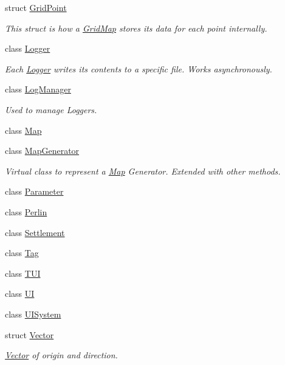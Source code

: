 \begin{DoxyCompactItemize}
struct \mbox{\hyperlink{struct_world_architect_1_1_grid_point}{Grid\+Point}}
\begin{DoxyCompactList}\small\item\em This struct is how a \mbox{\hyperlink{class_world_architect_1_1_grid_map}{Grid\+Map}} stores its data for each point internally. \end{DoxyCompactList}\item 
class \mbox{\hyperlink{class_world_architect_1_1_logger}{Logger}}
\begin{DoxyCompactList}\small\item\em Each \mbox{\hyperlink{class_world_architect_1_1_logger}{Logger}} writes it\textquotesingle{}s contents to a specific file. Works asynchronously. \end{DoxyCompactList}\item 
class \mbox{\hyperlink{class_world_architect_1_1_log_manager}{Log\+Manager}}
\begin{DoxyCompactList}\small\item\em Used to manage Loggers. \end{DoxyCompactList}\item 
class \mbox{\hyperlink{class_world_architect_1_1_map}{Map}}
\item 
class \mbox{\hyperlink{class_world_architect_1_1_map_generator}{Map\+Generator}}
\begin{DoxyCompactList}\small\item\em Virtual class to represent a \mbox{\hyperlink{class_world_architect_1_1_map}{Map}} Generator. Extended with other methods. \end{DoxyCompactList}\item 
class \mbox{\hyperlink{class_world_architect_1_1_parameter}{Parameter}}
\item 
class \mbox{\hyperlink{class_world_architect_1_1_perlin}{Perlin}}
\item 
class \mbox{\hyperlink{class_world_architect_1_1_settlement}{Settlement}}
\item 
class \mbox{\hyperlink{class_world_architect_1_1_tag}{Tag}}
\item 
class \mbox{\hyperlink{class_world_architect_1_1_t_u_i}{T\+UI}}
\item 
class \mbox{\hyperlink{class_world_architect_1_1_u_i}{UI}}
\item 
class \mbox{\hyperlink{class_world_architect_1_1_u_i_system}{U\+I\+System}}
\item 
struct \mbox{\hyperlink{struct_world_architect_1_1_vector}{Vector}}
\begin{DoxyCompactList}\small\item\em \mbox{\hyperlink{struct_world_architect_1_1_vector}{Vector}} of origin and direction. \end{DoxyCompactList}\end{DoxyCompactItemize}
